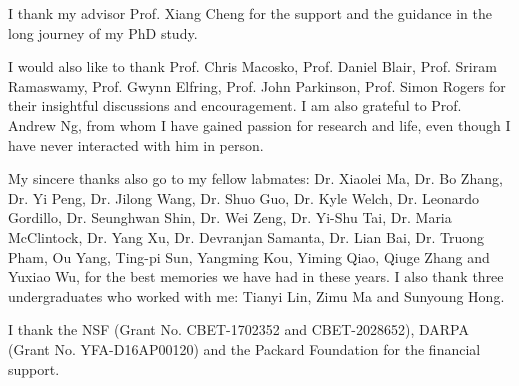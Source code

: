I thank my advisor Prof. Xiang Cheng for the support and the guidance in the long journey of my PhD study.

I would also like to thank Prof. Chris Macosko, Prof. Daniel Blair, Prof. Sriram Ramaswamy, Prof. Gwynn Elfring, Prof. John Parkinson, Prof. Simon Rogers for their insightful discussions and encouragement. I am also grateful to Prof. Andrew Ng, from whom I have gained passion for research and life, even though I have never interacted with him in person.

My sincere thanks also go to my fellow labmates: Dr. Xiaolei Ma, Dr. Bo Zhang, Dr. Yi Peng, Dr. Jilong Wang, Dr. Shuo Guo, Dr. Kyle Welch, Dr. Leonardo Gordillo, Dr. Seunghwan Shin, Dr. Wei Zeng, Dr. Yi-Shu Tai, Dr. Maria McClintock, Dr. Yang Xu, Dr. Devranjan Samanta, Dr. Lian Bai, Dr. Truong Pham, Ou Yang, Ting-pi Sun, Yangming Kou, Yiming Qiao, Qiuge Zhang and Yuxiao Wu, for the best memories we have had in these years. I also thank three undergraduates who worked with me: Tianyi Lin, Zimu Ma and Sunyoung Hong.

I thank the NSF (Grant No. CBET-1702352 and CBET-2028652), DARPA (Grant No. YFA-D16AP00120) and the Packard Foundation for the financial support.
